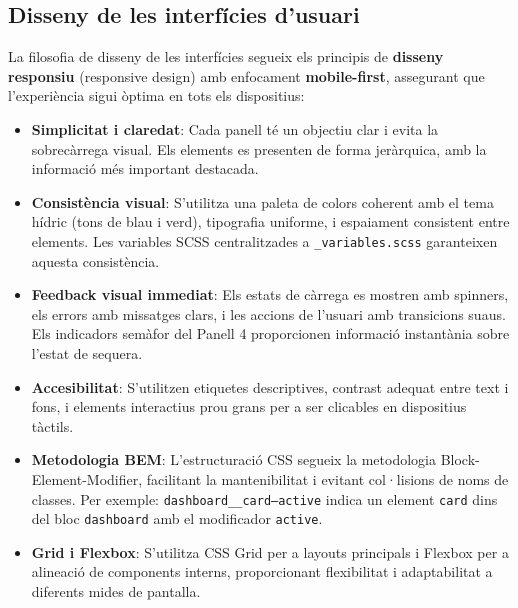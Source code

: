 
\subsection{Disseny de les interfícies d'usuari}

La filosofia de disseny de les interfícies segueix els principis de \textbf{disseny responsiu} (responsive design) amb enfocament \textbf{mobile-first}, assegurant que l'experiència sigui òptima en tots els dispositius:

\begin{itemize}
    \item \textbf{Simplicitat i claredat}: Cada panell té un objectiu clar i evita la sobrecàrrega visual. Els elements es presenten de forma jeràrquica, amb la informació més important destacada.
    
    \item \textbf{Consistència visual}: S'utilitza una paleta de colors coherent amb el tema hídric (tons de blau i verd), tipografia uniforme, i espaiament consistent entre elements. Les variables SCSS centralitzades a \texttt{\_variables.scss} garanteixen aquesta consistència.
    
    \item \textbf{Feedback visual immediat}: Els estats de càrrega es mostren amb spinners, els errors amb missatges clars, i les accions de l'usuari amb transicions suaus. Els indicadors semàfor del Panell 4 proporcionen informació instantània sobre l'estat de sequera.
    
    \item \textbf{Accesibilitat}: S'utilitzen etiquetes descriptives, contrast adequat entre text i fons, i elements interactius prou grans per a ser clicables en dispositius tàctils.
    
    \item \textbf{Metodologia BEM}: L'estructuració CSS segueix la metodologia Block-Element-Modifier, facilitant la mantenibilitat i evitant col·lisions de noms de classes. Per exemple: \texttt{dashboard\_\_card--active} indica un element \texttt{card} dins del bloc \texttt{dashboard} amb el modificador \texttt{active}.
    
    \item \textbf{Grid i Flexbox}: S'utilitza CSS Grid per a layouts principals i Flexbox per a alineació de components interns, proporcionant flexibilitat i adaptabilitat a diferents mides de pantalla.
\end{itemize}


